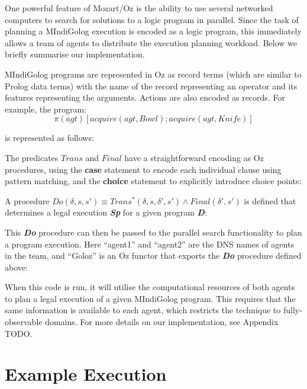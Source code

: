 One powerful feature of Mozart/Oz is the ability to use several networked
computers to search for solutions to a logic program in parallel.
Since the task of planning a MIndiGolog execution is encoded as a
logic program, this immediately allows a team of agents to distribute
the execution planning workload. Below we briefly summarise our implementation.

MIndiGolog programs are represented in Oz as record terms (which are
similar to Prolog data terms) with the name of the record representing
an operator and its features representing the arguments. Actions are
also encoded as records. For example, the program:\[
\pi(agt)\left[acquire(agt,Bowl);acquire(agt,Knife)\right]\]


is represented as follows:


The predicates $Trans$ and $Final$ have a straightforward encoding
as Oz procedures, using the \textbf{case} statement to encode each
individual clause using pattern matching, and the \textbf{choice}
statement to explicitly introduce choice points:



A procedure $Do(\delta,s,s')\equiv Trans^{*}(\delta,s,\delta',s')\wedge Final(\delta',s')$
is defined that determines a legal execution \textbf{\emph{Sp}} for
a given program \textbf{\emph{D}}:


This \textbf{\emph{Do}} procedure can then be passed to the parallel
search functionality to plan a program execution. Here {}``agent1''
and {}``agent2'' are the DNS names of agents in the team, and {}``Goloz''
is an Oz functor that exports the \textbf{\emph{Do}} procedure defined
above:


When this code is run, it will utilise the computational resources
of both agents to plan a legal execution of a given MIndiGolog program.
This requires that the same information is available to each agent,
which restricts the technique to fully-observable domains. For more
details on our implementation, see Appendix TODO.


\section{Example Execution\label{sec:MIndiGolog:Example-Execution}}

